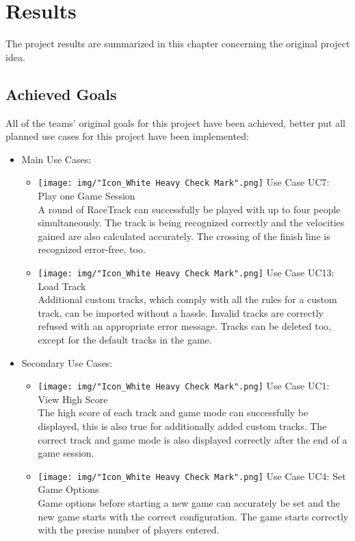 \chapter{Results}
	The project results are summarized in this chapter concerning the original project idea.

	\section{Achieved Goals}
		All of the teams' original goals for this project have been achieved, better put all planned use cases for this project have been implemented:
		\begin{itemize}
			\item Main Use Cases:
			\begin{itemize}
				\item \texttt{[image: img/"Icon\_White Heavy Check Mark".png]} Use Case UC7: Play one Game Session \\
				A round of RaceTrack can successfully be played with up to four people simultaneously. The track is being recognized correctly and the velocities gained are also calculated accurately. The crossing of the finish line is recognized error-free, too.
				\item \texttt{[image: img/"Icon\_White Heavy Check Mark".png]} Use Case UC13: Load Track \\
				Additional custom tracks, which comply with all the rules for a custom track, can be imported without a hassle. Invalid tracks are correctly refused with an appropriate error message. Tracks can be deleted too, except for the default tracks in the game.
			\end{itemize}
			\item Secondary Use Cases:
			\begin{itemize}
				\item \texttt{[image: img/"Icon\_White Heavy Check Mark".png]} Use Case UC1: View High Score \\
				The high score of each track and game mode can successfully be displayed, this is also true for additionally added custom tracks. The correct track and game mode is also displayed correctly after the end of a game session.
				\item \texttt{[image: img/"Icon\_White Heavy Check Mark".png]} Use Case UC4: Set Game Options \\
				Game options before starting a new game can accurately be set and the new game starts with the correct configuration. The game starts correctly with the precise number of players entered.

\end{itemize}
\end{itemize}

